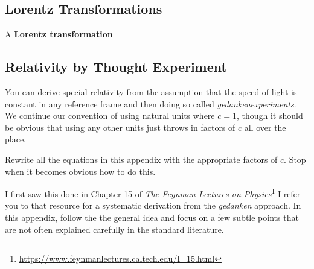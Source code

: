 \documentclass[12pt, oneside]{report}    %
\let\oldsection\section
\def\section{%
  \setcounter{sidenote}{1}%
  \oldsection
}
\begin{document}
\subsection{Lorentz Transformations}

A \textbf{Lorentz transformation} 


\begin{subappendices}

\section{Relativity by Thought Experiment}\label{sec:subappendix:relativity}
You can derive special relativity from the assumption that the speed of light is constant in any reference frame and then doing so called \emph{gedankenexperiments}. We continue our convention of using natural units where $c=1$, though it should be obvious that using any other units just throws in factors of $c$ all over the place.
\begin{exercise}
Rewrite all the equations in this appendix with the appropriate factors of $c$. Stop when it becomes obvious how to do this. 
\end{exercise}
I first saw this done in Chapter 15 of \emph{The Feynman Lectures on Physics}\footnote{\url{https://www.feynmanlectures.caltech.edu/I_15.html}} I refer you to that resource for a systematic derivation from the \emph{gedanken} approach. In this appendix, follow the the general idea and focus on a few subtle points that are not often explained carefully in the standard literature.


\end{subappendices}
\end{document}
